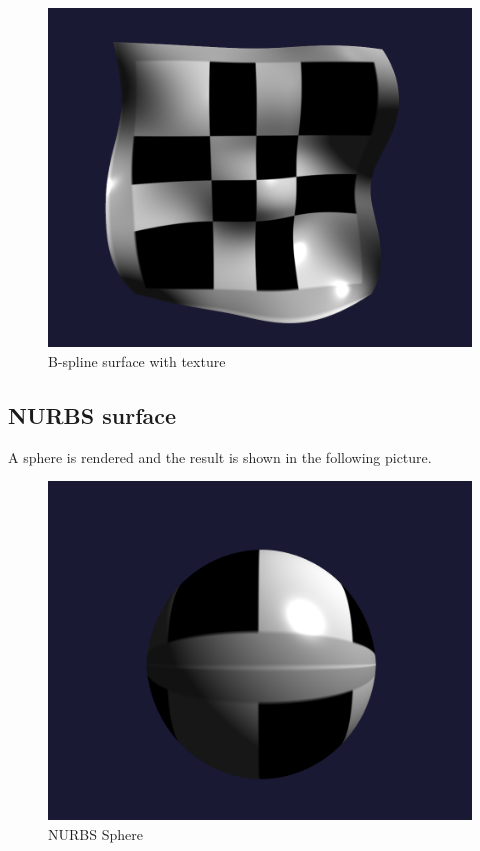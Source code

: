 \documentclass[acmtog]{acmart}
\begin{document}
\begin{figure}[h]
	\centering
	\includegraphics[scale=0.25]{mesh.png}
	\caption{B-spline surface with texture}
\end{figure}

\subsection{NURBS surface}
A sphere is rendered and the result is shown in the following picture.
\begin{figure}[h]
	\centering
	\includegraphics[scale=0.25]{nurbs.png}
	\caption{NURBS Sphere}
\end{figure}
\end{document}
